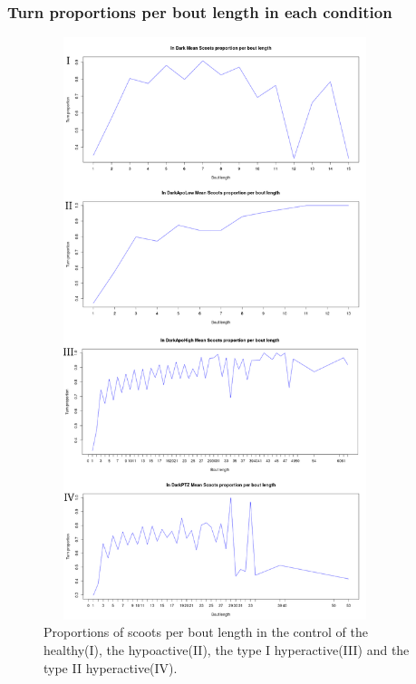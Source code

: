\subsubsection{Turn proportions per bout length in each condition}

\begin{figure}[h!]
\begin{center}
\includegraphics[width=10cm,height=17cm]{boutlengthturnproportion.png}
\caption{Proportions of scoots per bout length in the control of the healthy(I), the hypoactive(II), the type I hyperactive(III) and the type II hyperactive(IV).}
\end{center}
\end{figure}
\newpage

